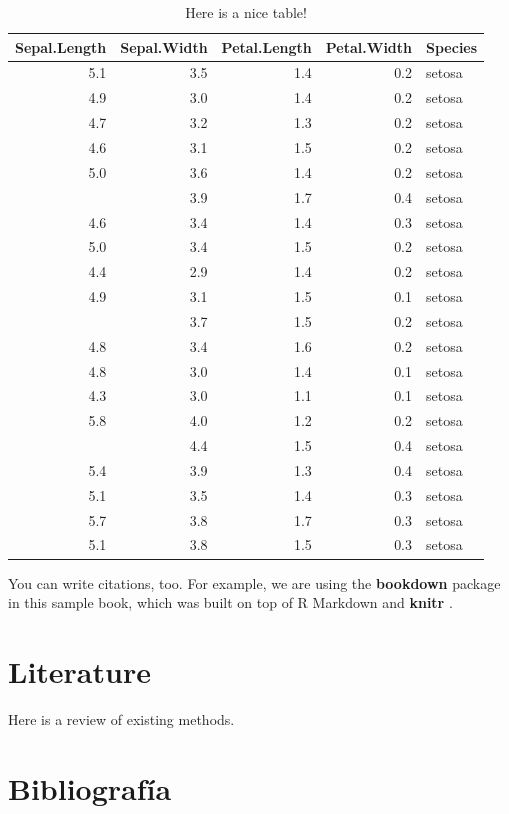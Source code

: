 \documentclass[]{article}
\begin{document}
\begin{table}

\caption{\label{tab:nice-tab}Here is a nice table!}
\centering
\begin{tabular}[t]{rrrrl}
\toprule
Sepal.Length & Sepal.Width & Petal.Length & Petal.Width & Species\\
\midrule
5.1 & 3.5 & 1.4 & 0.2 & setosa\\
4.9 & 3.0 & 1.4 & 0.2 & setosa\\
4.7 & 3.2 & 1.3 & 0.2 & setosa\\
4.6 & 3.1 & 1.5 & 0.2 & setosa\\
5.0 & 3.6 & 1.4 & 0.2 & setosa\\
\addlinespace
5.4 & 3.9 & 1.7 & 0.4 & setosa\\
4.6 & 3.4 & 1.4 & 0.3 & setosa\\
5.0 & 3.4 & 1.5 & 0.2 & setosa\\
4.4 & 2.9 & 1.4 & 0.2 & setosa\\
4.9 & 3.1 & 1.5 & 0.1 & setosa\\
\addlinespace
5.4 & 3.7 & 1.5 & 0.2 & setosa\\
4.8 & 3.4 & 1.6 & 0.2 & setosa\\
4.8 & 3.0 & 1.4 & 0.1 & setosa\\
4.3 & 3.0 & 1.1 & 0.1 & setosa\\
5.8 & 4.0 & 1.2 & 0.2 & setosa\\
\addlinespace
5.7 & 4.4 & 1.5 & 0.4 & setosa\\
5.4 & 3.9 & 1.3 & 0.4 & setosa\\
5.1 & 3.5 & 1.4 & 0.3 & setosa\\
5.7 & 3.8 & 1.7 & 0.3 & setosa\\
5.1 & 3.8 & 1.5 & 0.3 & setosa\\
\bottomrule
\end{tabular}
\end{table}

You can write citations, too. For example, we are using the
\textbf{bookdown} package \autocite{R-bookdown} in this sample book,
which was built on top of R Markdown and \textbf{knitr}
\autocite{xie2015}.

\section{Literature}\label{literature}

Here is a review of existing methods.

\section{Bibliografía}\label{bibliografuxeda}
\end{document}
